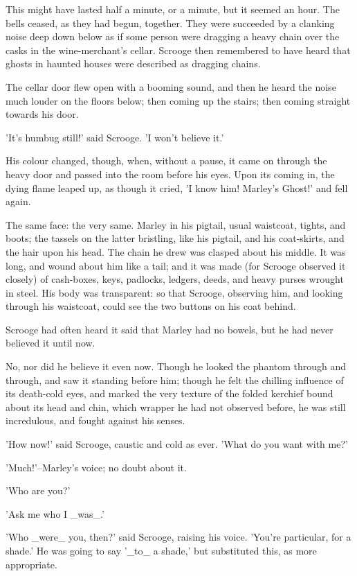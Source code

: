 This might have lasted half a minute, or a minute, but it seemed an
hour. The bells ceased, as they had begun, together. They were succeeded
by a clanking noise deep down below as if some person were dragging a
heavy chain over the casks in the wine-merchant's cellar. Scrooge then
remembered to have heard that ghosts in haunted houses were described as
dragging chains.

The cellar door flew open with a booming sound, and then he heard the
noise much louder on the floors below; then coming up the stairs; then
coming straight towards his door.

'It's humbug still!' said Scrooge. 'I won't believe it.'

His colour changed, though, when, without a pause, it came on through
the heavy door and passed into the room before his eyes. Upon its coming
in, the dying flame leaped up, as though it cried, 'I know him! Marley's
Ghost!' and fell again.

The same face: the very same. Marley in his pigtail, usual waistcoat,
tights, and boots; the tassels on the latter bristling, like his
pigtail, and his coat-skirts, and the hair upon his head. The chain he
drew was clasped about his middle. It was long, and wound about him like
a tail; and it was made (for Scrooge observed it closely) of cash-boxes,
keys, padlocks, ledgers, deeds, and heavy purses wrought in steel. His
body was transparent: so that Scrooge, observing him, and looking
through his waistcoat, could see the two buttons on his coat behind.

Scrooge had often heard it said that Marley had no bowels, but he had
never believed it until now.

No, nor did he believe it even now. Though he looked the phantom through
and through, and saw it standing before him; though he felt the chilling
influence of its death-cold eyes, and marked the very texture of the
folded kerchief bound about its head and chin, which wrapper he had not
observed before, he was still incredulous, and fought against his
senses.

'How now!' said Scrooge, caustic and cold as ever. 'What do you want
with me?'

'Much!'--Marley's voice; no doubt about it.

'Who are you?'

'Ask me who I _was_.'

'Who _were_ you, then?' said Scrooge, raising his voice. 'You're
particular, for a shade.' He was going to say '_to_ a shade,' but
substituted this, as more appropriate.

